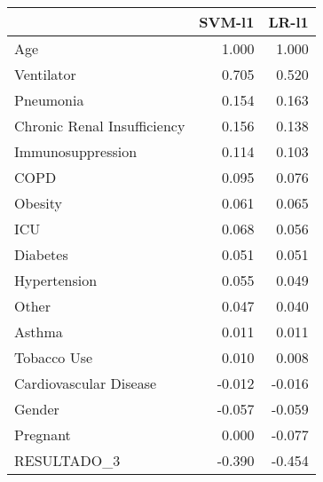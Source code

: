 \begin{tabular}{lrr}
\toprule
{} &  SVM-l1 &  LR-l1 \\
\midrule
Age                         &   1.000 &  1.000 \\
Ventilator                  &   0.705 &  0.520 \\
Pneumonia                   &   0.154 &  0.163 \\
Chronic Renal Insufficiency &   0.156 &  0.138 \\
Immunosuppression           &   0.114 &  0.103 \\
COPD                        &   0.095 &  0.076 \\
Obesity                     &   0.061 &  0.065 \\
ICU                         &   0.068 &  0.056 \\
Diabetes                    &   0.051 &  0.051 \\
Hypertension                &   0.055 &  0.049 \\
Other                       &   0.047 &  0.040 \\
Asthma                      &   0.011 &  0.011 \\
Tobacco Use                 &   0.010 &  0.008 \\
Cardiovascular Disease      &  -0.012 & -0.016 \\
Gender                      &  -0.057 & -0.059 \\
Pregnant                    &   0.000 & -0.077 \\
RESULTADO\_3                 &  -0.390 & -0.454 \\
\bottomrule
\end{tabular}
